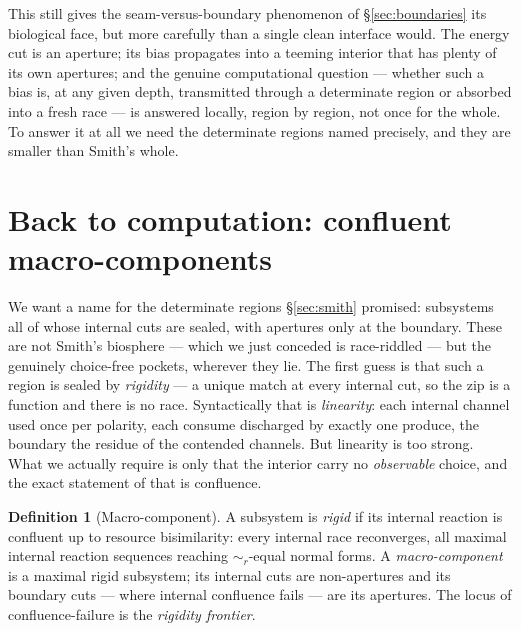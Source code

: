 \documentclass[11pt]{article}
\theoremstyle{definition}
\newtheorem{definition}{Definition}
\theoremstyle{plain}
\theoremstyle{remark}
\newcommand{\rbisim}{\sim_{r}}
\begin{document}
\noindent
This still gives the seam-versus-boundary phenomenon of \S\ref{sec:boundaries} its
biological face, but more carefully than a single clean interface would. The energy cut
is an aperture; its bias propagates into a teeming interior that has plenty of its own
apertures; and the genuine computational question --- whether such a bias is, at any
given depth, transmitted through a determinate region or absorbed into a fresh race ---
is answered locally, region by region, not once for the whole. To answer it at all we
need the determinate regions named precisely, and they are smaller than Smith's whole.

\section{Back to computation: confluent macro-components}\label{sec:macro}

We want a name for the determinate regions \S\ref{sec:smith} promised: subsystems all
of whose internal cuts are sealed, with apertures only at the boundary. These are not
Smith's biosphere --- which we just conceded is race-riddled --- but the genuinely
choice-free pockets, wherever they lie. The first guess is that such a region is sealed
by \emph{rigidity} --- a unique match at every internal cut, so the zip is a function
and there is no race. Syntactically that is \emph{linearity}: each internal channel used
once per polarity, each consume discharged by exactly one produce, the boundary the
residue of the contended channels. But linearity is too strong. What we actually require
is only that the interior carry no \emph{observable} choice, and the exact statement of
that is confluence.

\begin{definition}[Macro-component]\label{def:macro}
A subsystem is \emph{rigid} if its internal reaction is confluent up to resource
bisimilarity: every internal race reconverges, all maximal internal reaction
sequences reaching $\rbisim$-equal normal forms. A \emph{macro-component} is a maximal
rigid subsystem; its internal cuts are non-apertures and its boundary cuts --- where
internal confluence fails --- are its apertures. The locus of confluence-failure is the
\emph{rigidity frontier}.
\end{definition}
\end{document}
